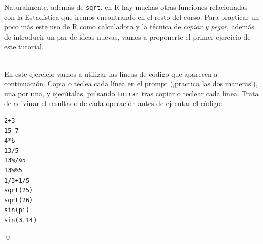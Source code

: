 \documentclass[10pt,a4paper]{article}\usepackage[]{graphicx}\usepackage[]{color}
\newcounter {cont01}
\begin{document}
Naturalmente, además de {\tt sqrt}, en R hay muchas otras funciones relacionadas con la Estadística que iremos encontrando en el resto del curso. Para practicar un poco más este uso de R como calculadora y la técnica de {\em copiar y pegar}, además de introducir un par de ideas nuevas, vamos a proponerte el primer ejercicio de este tutorial.

\begin{ejercicio}
\label{tut02:ejercicio01}
\quad\\
En este ejercicio vamos a utilizar las líneas de  código que aparecen a continuación. Copia o teclea cada línea en el prompt (¡practica las dos maneras!), una por una, y ejecútalas, pulsando {\tt Entrar} tras copiar o teclear cada línea. Trata de adivinar el resultado de cada operación antes de ejecutar el código:
\begin{verbatim}
2+3
15-7
4*6
13/5
13%/%5
13%%5
1/3+1/5
sqrt(25)
sqrt(26)
sin(pi)
sin(3.14)
\end{verbatim}
\qed
\end{ejercicio}
\end{document}
